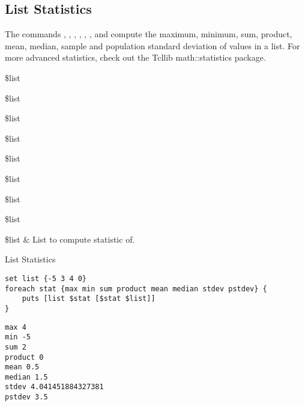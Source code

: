\subsection{List Statistics}
The commands , , , , , ,  and  compute the maximum, minimum, sum, product, mean, median, sample and population standard deviation of values in a list.
For more advanced statistics, check out the Tcllib math::statistics package.
\begin{syntax}
 \$list 
\end{syntax}
\begin{syntax}
 \$list 
\end{syntax}
\begin{syntax}
 \$list
\end{syntax}
\begin{syntax}
 \$list
\end{syntax}
\begin{syntax}
 \$list 
\end{syntax}
\begin{syntax}
 \$list 
\end{syntax}
\begin{syntax}
 \$list
\end{syntax}
\begin{syntax}
 \$list
\end{syntax}
\begin{args}
\$list & List to compute statistic of. \\
\end{args}
\begin{example}{List Statistics}
\begin{lstlisting}
set list {-5 3 4 0}
foreach stat {max min sum product mean median stdev pstdev} {
    puts [list $stat [$stat $list]]
}
\end{lstlisting}
\tcblower
\begin{lstlisting}
max 4
min -5
sum 2
product 0
mean 0.5
median 1.5
stdev 4.041451884327381
pstdev 3.5
\end{lstlisting}
\end{example}
\clearpage
